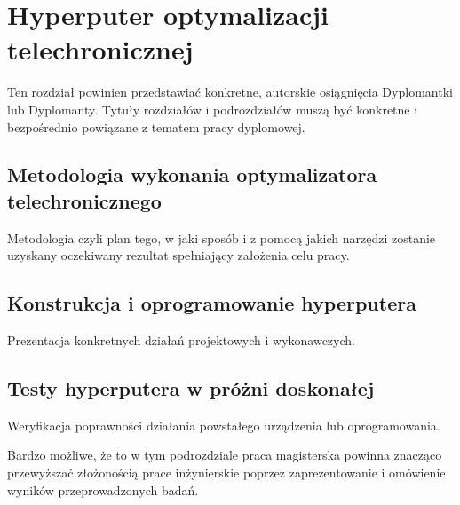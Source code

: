 \chapter{Hyperputer optymalizacji telechronicznej}

Ten rozdział powinien przedstawiać konkretne, autorskie osiągnięcia Dyplomantki lub Dyplomanty. Tytuły rozdziałów i podrozdziałów muszą być konkretne i bezpośrednio powiązane z tematem pracy dyplomowej.

\section{Metodologia wykonania optymalizatora telechronicznego}

Metodologia czyli plan tego, w jaki sposób i z pomocą jakich narzędzi zostanie uzyskany oczekiwany rezultat spełniający założenia celu pracy.

\section{Konstrukcja i oprogramowanie hyperputera}

Prezentacja konkretnych działań projektowych i wykonawczych.

\section{Testy hyperputera w próżni doskonałej}

Weryfikacja poprawności działania powstałego urządzenia lub oprogramowania.

Bardzo możliwe, że to w tym podrozdziale praca magisterska powinna znacząco przewyższać złożonością prace inżynierskie poprzez zaprezentowanie i omówienie wyników przeprowadzonych badań.
